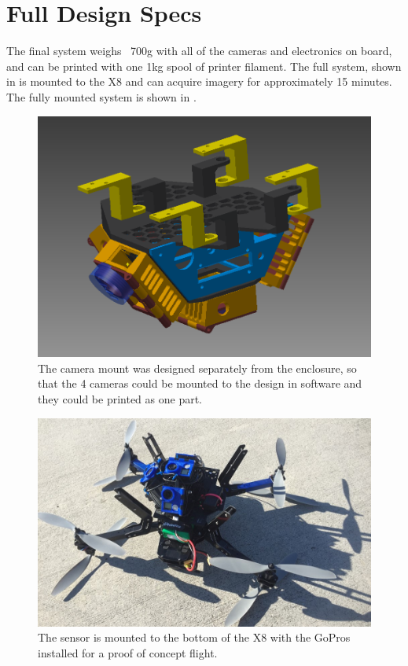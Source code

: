 	\section{Full Design Specs}
	The final system weighs ~700g with all of the cameras and electronics on board, and can be printed with one 1kg spool of printer filament.  The full system, shown in  is mounted to the X8 and can acquire imagery for approximately 15 minutes.  The fully mounted system is shown in .  
	
	\begin{figure}[H]
		\centering
		\includegraphics[scale = 0.4]{../figures/cad/all.png}
		\caption{The camera mount was designed separately from the enclosure, so that the 4 cameras could be mounted to the design in software and they could be printed as one part.}
		\label{fig:mountcombo}
	\end{figure}

	\begin{figure}[H]
		\centering
		\includegraphics[scale = 0.7]{../figures/mvssv2.jpg}
		\caption{The sensor is mounted to the bottom of the X8 with the GoPros installed for a proof of concept flight.}
		\label{fig:x8mounted}
	\end{figure}
	
